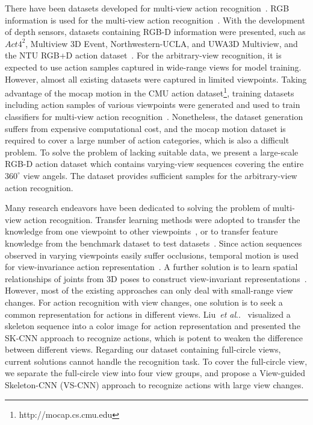 \documentclass[journal]{IEEEtran}
\makeatletter
\DeclareRobustCommand\onedot{\futurelet\@let@token\@onedot}
\def\@onedot{\ifx\@let@token.\else.\null\fi\xspace}
\def\etal{\emph{et al}\onedot}
\makeatother
\begin{document}
There have been datasets developed for multi-view action recognition~\cite{IXMAS2006}. RGB information is used for the multi-view action recognition~\cite{IXMAS2007,LiuTransfer2011}. With the development of depth sensors, datasets containing RGB-D information were presented, such as $Act4^2$, Multiview 3D Event, Northwestern-UCLA, and UWA3D Multiview, and the NTU RGB+D action dataset~\cite{ChengACT42012,Wei4DHOI2013,WangMSTAOG2014,RahmaniUWA3D2016,ShahroudyNTU2016}. For the arbitrary-view recognition, it is expected to use action samples captured in wide-range views for model training. However, almost all existing datasets were captured in limited viewpoints. Taking advantage of the mocap motion in the CMU action dataset\footnote{http://mocap.cs.cmu.edu}, training datasets including action samples of various viewpoints were generated and used to train classifiers for multi-view action recognition~\cite{Gupta3Dpose2014,RahmaniNKTM2015,RahmaniNovelV2016}. Nonetheless, the dataset generation suffers from expensive computational cost, and the mocap motion dataset is required to cover a large number of action categories, which is also a difficult problem.
To solve the problem of lacking suitable data, we present a large-scale RGB-D action dataset which contains varying-view sequences covering the entire $360^\circ$ view angels. The dataset provides sufficient samples for the arbitrary-view action recognition.


Many research endeavors have been dedicated to solving the problem of multi-view action recognition. Transfer learning methods were adopted to transfer the knowledge from one viewpoint to other viewpoints~\cite{Rybok2011,Li2012,Zhang2013,M2Ibenchmark2016,GaoCollab2017}, or to transfer feature knowledge from the benchmark dataset to test datasets~\cite{LiuTransfer2011}. Since action sequences observed in varying viewpoints easily suffer occlusions, temporal motion is used for view-invariance action representation~\cite{ShahroudyNTU2016,InteractionJi2015,Wei4DHOI2013}. A further solution is to learn spatial relationships of joints from 3D poses to construct view-invariant representations~\cite{RahmaniHOPC2014,WangActionlet2013,Ji2017One}. However, most of the existing approaches can only deal with small-range view changes. For action recognition with view changes, one solution is to seek a common representation for actions in different views. Liu~\etal~\cite{EnhancedSK2017} visualized a skeleton sequence into a color image for action representation and presented the SK-CNN approach to recognize actions, which is potent to weaken the difference between different views. Regarding our dataset containing full-circle views, current solutions cannot handle the recognition task. To cover the full-circle view, we separate the full-circle view into four view groups, and propose a View-guided Skeleton-CNN (VS-CNN) approach to recognize actions with large view changes.
\end{document}
